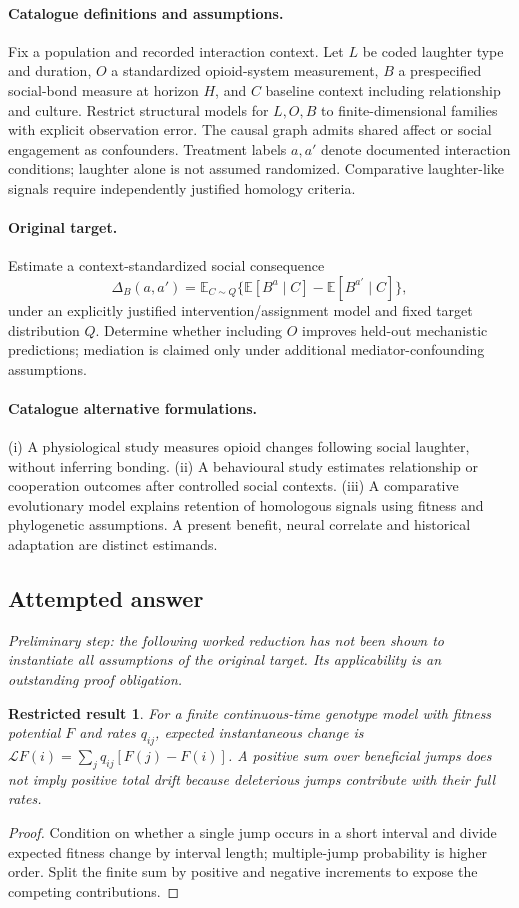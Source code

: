 \documentclass[11pt]{article}
\newcommand{\E}{\mathbb E}
\providecommand{\E}{\mathbb E}
\newtheorem{attemptresult}{Restricted result}[section]
\begin{document}
\paragraph{Catalogue definitions and assumptions.}
Fix a population and recorded interaction context. Let $L$ be coded laughter type and duration, $O$ a standardized opioid-system measurement, $B$ a prespecified social-bond measure at horizon $H$, and $C$ baseline context including relationship and culture. Restrict structural models for $L,O,B$ to finite-dimensional families with explicit observation error. The causal graph admits shared affect or social engagement as confounders. Treatment labels $a,a'$ denote documented interaction conditions; laughter alone is not assumed randomized. Comparative laughter-like signals require independently justified homology criteria.
\paragraph{Original target.}
Estimate a context-standardized social consequence
    \[\Delta_B(a,a')=\E_{C\sim Q}\{
       \E[B^a\mid C]-\E[B^{a'}\mid C]\},\]
    under an explicitly justified intervention/assignment model and fixed target distribution $Q$. Determine whether including $O$ improves held-out mechanistic predictions; mediation is claimed only under additional mediator-confounding assumptions.
\paragraph{Catalogue alternative formulations.}
(i) A physiological study measures opioid changes following social laughter, without inferring bonding. (ii) A behavioural study estimates relationship or cooperation outcomes after controlled social contexts. (iii) A comparative evolutionary model explains retention of homologous signals using fitness and phylogenetic assumptions. A present benefit, neural correlate and historical adaptation are distinct estimands.
\subsection{Attempted answer}
\noindent\emph{Preliminary step: the following worked reduction has not been shown to instantiate all assumptions of the original target. Its applicability is an outstanding proof obligation.}

\begin{attemptresult}
For a finite continuous-time genotype model with fitness potential $F$ and rates $q_{ij}$, expected instantaneous change is $\mathcal LF(i)=\sum_jq_{ij}[F(j)-F(i)]$. A positive sum over beneficial jumps does not imply positive total drift because deleterious jumps contribute with their full rates.
\end{attemptresult}
\begin{proof}
Condition on whether a single jump occurs in a short interval and divide expected fitness change by interval length; multiple-jump probability is higher order. Split the finite sum by positive and negative increments to expose the competing contributions.
\end{proof}
\end{document}
